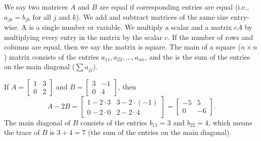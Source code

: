 We say two matrices {$A$} and {$B$} are equal if corresponding entries
are equal (i.e., {$a_{jk}=b_{jk}$} for all $j$ and $k$). We add and
subtract matrices of the same size entry-wise.  A  is a
single number or variable.  We multiply a scalar and a matrix $cA$ by multiplying every entry in the matrix by the scalar {$c$}. If the number of rows and columns are equal, then we say the matrix is square.  The main  of a square ({$n \times n$}) matrix consists of the entries {$a_{11},a_{22},\ldots,a_{nn}$}, and the  is the sum of the entries on the main diagonal ($\sum a_{jj}$). 
\begin{example}
If $A=\begin{bmatrix}
1&3\\
0&2
\end{bmatrix}
$ and 
$B=
\begin{bmatrix}
3&-1\\
0&4
\end{bmatrix}
$, then $$A-2B
=\begin{bmatrix}
1-2\cdot3&3-2\cdot(-1)\\
0-2\cdot 0& 2-2\cdot 4
\end{bmatrix}
=\begin{bmatrix}
-5&5\\
0&-6
\end{bmatrix}.$$ The main diagonal of $B$ consists of the entries $b_{11} = 3$ and $b_{22}=4$, which means the trace of $B$ is $3+4=7$ (the sum of the entries on the main diagonal).
\end{example}

